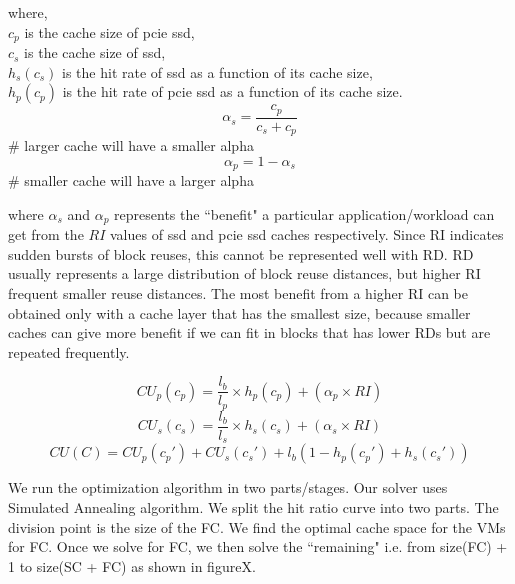 where, \\ 
$c_p$ is the cache size of pcie ssd, \\
$c_s$ is the cache size of ssd, \\
$h_s(c_s)$ is the hit rate of ssd as a function of its cache size, \\
$h_p(c_p)$ is the hit rate of pcie ssd as a function of its cache size.  \\


$$   \alpha_s = \frac{c_p}{c_s + c_p} $$ \# larger cache will have a smaller alpha
$$   \alpha_p = 1-\alpha_s $$ \# smaller cache will have a larger alpha

where $\alpha_s$ and $\alpha_p$ represents the ``benefit" a particular application/workload can get from the $RI$ values of ssd and pcie ssd caches respectively. Since RI indicates sudden bursts of block reuses, this cannot be represented well with RD. RD usually represents a large distribution of block reuse distances, but higher RI frequent smaller reuse distances. The most benefit from a higher RI can be obtained only with a cache layer that has the smallest size, because smaller caches can give more benefit if we can fit in blocks that has lower RDs but are repeated frequently.



$$ CU_p(c_p) = \frac{l_b}{l_p} \times h_p(c_p) + (\alpha_p \times RI) $$
$$ CU_s(c_s) = \frac{l_b}{l_s} \times h_s(c_s) + (\alpha_s \times RI) $$
$$ CU(C) = CU_p(c_p') + CU_s(c_s') + l_b (1 - h_p(c_p') + h_s(c_s')) $$ 

We run the optimization algorithm in two parts/stages. Our solver uses Simulated Annealing algorithm. We split the hit ratio curve into two parts. The division point is the size of the FC. We find the optimal cache space for the VMs for FC. Once we solve for FC, we then solve the ``remaining" i.e. from size(FC) + 1 to size(SC + FC) as shown in figureX.
